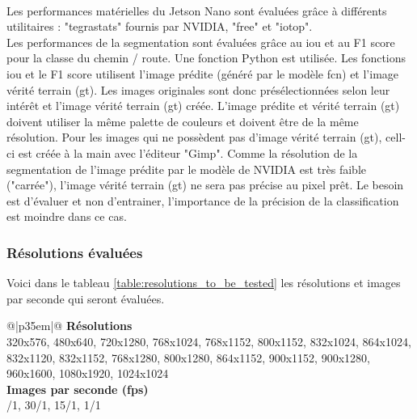 \vspace{\baselineskip}
\\
\noindent Les performances matérielles du Jetson Nano sont évaluées grâce à différents utilitaires : "tegrastats" fournis par NVIDIA, "free" et "iotop".
\vspace{\baselineskip}
\\
\noindent Les performances de la segmentation sont évaluées grâce au \acrshort{iou} et au F1 score pour la classe du chemin / route. Une fonction Python est utilisée. Les fonctions \acrshort{iou} et le F1 score utilisent l'image prédite (généré par le modèle \acrshort{fcn}) et l'image vérité terrain (\acrshort{gt}). Les images originales sont donc présélectionnées selon leur intérêt et l'image vérité terrain (\acrshort{gt}) créée. L'image prédite et vérité terrain (\acrshort{gt}) doivent utiliser la même palette de couleurs et doivent être de la même résolution. Pour les images qui ne possèdent pas d'image vérité terrain (\acrshort{gt}), cell-ci est créée à la main avec l'éditeur "Gimp". Comme la résolution de la segmentation de l'image prédite par le modèle de NVIDIA est très faible ("carrée"), l'image vérité terrain (\acrshort{gt}) ne sera pas précise au pixel prêt. Le besoin est d'évaluer et non d'entrainer, l'importance de la précision de la classification est moindre dans ce cas. 
\subsubsection{Résolutions évaluées}\label{section:resolutions_to_be_tested}
Voici dans le tableau \ref{table:resolutions_to_be_tested} les résolutions et images par seconde qui seront évaluées. 
{
    \renewcommand*{\arraystretch}{1.4}
    \begin{table}[ht]
    \centering
    \caption{Résolutions et images par seconde (\acrshort{fps}) qui seront évaluées}\label{table:resolutions_to_be_tested}
    \vspace{0.1em} %
    \begin{tabular}{{@{}|p{35em}|@{}}}
         \hline
         \textbf{Résolutions}\\
         \hline
        320x576, 480x640, 720x1280, 768x1024, 768x1152, 800x1152, 832x1024, 864x1024, 832x1120, 832x1152, 768x1280, 800x1280, 864x1152, 900x1152, 900x1280, 960x1600, 1080x1920, 1024x1024\\
        \hline
        \textbf{Images par seconde (\acrshort{fps}) }\\
        /1, 30/1, 15/1, 1/1\\
        \hline
    \end{tabular}
    \end{table}
}